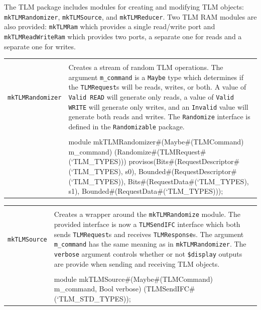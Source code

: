\documentclass[twoside,letterpaper]{article}
\newcommand{\te}[1]{\texttt{#1}}
\newenvironment{libverbatim}
  {\vspace*{-1.0em}
   \verbatim}
  {\endverbatim
  }
\begin{document}
The TLM package includes modules for creating and modifying TLM
objects: \te{mkTLMRandomizer}, \te{mkTLMSource}, and
\te{mkTLMReducer}.  Two TLM RAM modules are also provided:
\te{mkTLMRam} which provides a single read/write port and
\te{mkTLMReadWriteRam} which provides two ports, a separate one for
reads and a separate one for writes.

\begin{center}
\begin{tabular}{|p{1.2 in}|p{5 in}|}
\hline 
&\\
\te{mkTLMRandomizer}&Creates a stream of random TLM
operations.  The argument \te{m\_command} is a \te{Maybe} type which
determines if the \te{TLMRequest}s will be reads, writes, or both. A
value of \te{Valid READ} will generate only reads, a value of
\te{Valid WRITE} will generate only writes, and an \te{Invalid} value will
generate both reads and writes. The \te{Randomize} interface is
defined in the \te{Randomizable} package. \\
&\\
\cline{2-2}
&\begin{libverbatim}
module mkTLMRandomizer#(Maybe#(TLMCommand) m_command) 
                       (Randomize#(TLMRequest#(`TLM_TYPES)))
   provisos(Bits#(RequestDescriptor#(`TLM_TYPES), s0),
            Bounded#(RequestDescriptor#(`TLM_TYPES)),
            Bits#(RequestData#(`TLM_TYPES), s1),
            Bounded#(RequestData#(`TLM_TYPES)));
\end{libverbatim}
\\
\hline
\end{tabular}
\end{center}

\begin{center}
\begin{tabular}{|p{1.2 in}|p{5 in}|}
\hline 
&\\
\te{mkTLMSource}&Creates a wrapper around the \te{mkTLMRandomize} module.
The provided interface is now a \te{TLMSendIFC} interface which both
sends \te{TLMRequest}s and receives \te{TLMResponse}s. The argument
\te{m\_command} has the same meaning as in \te{mkTLMRandomizer}. The \te{verbose} 
argument controls whether or not  \te{\$display} outputs are provide when
sending and receiving TLM objects. \\
&\\
\cline{2-2}
&\begin{libverbatim}
module mkTLMSource#(Maybe#(TLMCommand) m_command, Bool verbose) 
                   (TLMSendIFC#(`TLM_STD_TYPES));
\end{libverbatim}
\\
\hline
\end{tabular}
\end{center}
\end{document}
